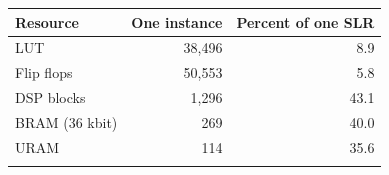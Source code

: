 \begin{tabular}{@{}lrr@{}}
\toprule
Resource & One instance & Percent of one SLR \\
\midrule
LUT & 38{,}496 & 8.9 \\
Flip flops & 50{,}553 & 5.8 \\
DSP blocks & 1{,}296 & 43.1 \\
BRAM (36 kbit) & 269 & 40.0 \\
URAM & 114 & 35.6 \\
\botrule
\end{tabular}
